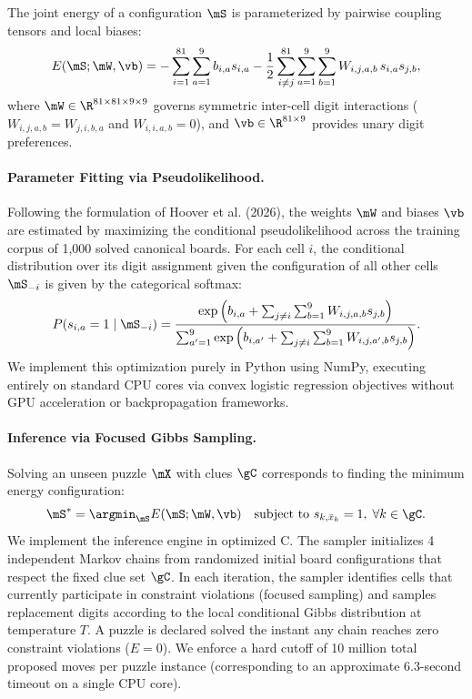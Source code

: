 \documentclass{article} %
\begin{document}
The joint energy of a configuration $\mS$ is parameterized by pairwise coupling tensors and local biases:
\begin{equation}
    E(\mS; \mW, \vb) = - \sum_{i=1}^{81} \sum_{a=1}^9 b_{i, a} s_{i, a} - \frac{1}{2} \sum_{i \neq j}^{81} \sum_{a=1}^9 \sum_{b=1}^9 W_{i, j, a, b} \, s_{i, a} s_{j, b},
\end{equation}
where $\mW \in \R^{81 \times 81 \times 9 \times 9}$ governs symmetric inter-cell digit interactions ($W_{i, j, a, b} = W_{j, i, b, a}$ and $W_{i, i, a, b} = 0$), and $\vb \in \R^{81 \times 9}$ provides unary digit preferences.

\paragraph{Parameter Fitting via Pseudolikelihood.} Following the formulation of Hoover et al. (2026), the weights $\mW$ and biases $\vb$ are estimated by maximizing the conditional pseudolikelihood across the training corpus of 1,000 solved canonical boards. For each cell $i$, the conditional distribution over its digit assignment given the configuration of all other cells $\mS_{-i}$ is given by the categorical softmax:
\begin{equation}
    P(s_{i, a} = 1 \mid \mS_{-i}) = \frac{\exp\left( b_{i, a} + \sum_{j \neq i} \sum_{b=1}^9 W_{i, j, a, b} s_{j, b} \right)}{\sum_{a'=1}^9 \exp\left( b_{i, a'} + \sum_{j \neq i} \sum_{b=1}^9 W_{i, j, a', b} s_{j, b} \right)}.
\end{equation}
We implement this optimization purely in Python using NumPy, executing entirely on standard CPU cores via convex logistic regression objectives without GPU acceleration or backpropagation frameworks.

\paragraph{Inference via Focused Gibbs Sampling.} Solving an unseen puzzle $\mX$ with clues $\gC$ corresponds to finding the minimum energy configuration:
\begin{equation}
    \mS^* = \argmin_{\mS} E(\mS; \mW, \vb) \quad \text{subject to } s_{k, \bar{x}_k} = 1, \; \forall k \in \gC.
\end{equation}
We implement the inference engine in optimized C. The sampler initializes 4 independent Markov chains from randomized initial board configurations that respect the fixed clue set $\gC$. In each iteration, the sampler identifies cells that currently participate in constraint violations (focused sampling) and samples replacement digits according to the local conditional Gibbs distribution at temperature $T$. A puzzle is declared solved the instant any chain reaches zero constraint violations ($E = 0$). We enforce a hard cutoff of 10 million total proposed moves per puzzle instance (corresponding to an approximate 6.3-second timeout on a single CPU core).
\end{document}
